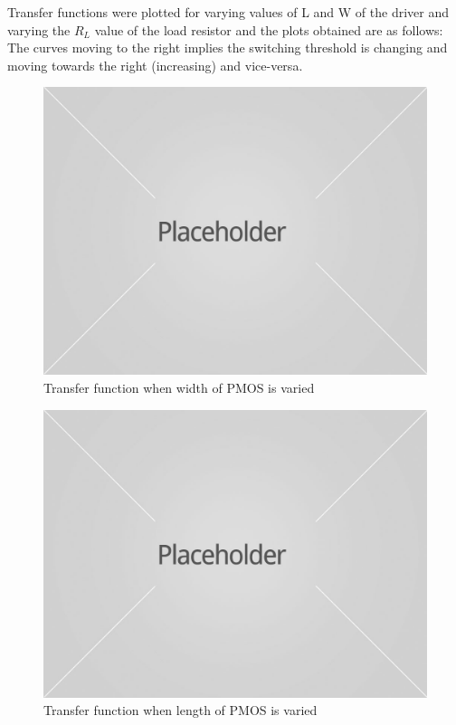 \documentclass[12pt,a4paper]{article}
\begin{document}
Transfer functions were plotted for varying values of L and W of the driver and varying the $R_L$ value of the load resistor and the plots obtained are as follows:\\

The curves moving to the right implies the switching threshold is changing and moving towards the right (increasing) and vice-versa.\\

\begin{figure}[H]
\begin{center}
\includegraphics[scale=0.20]{placeholder.jpg}
\caption{Transfer function when width of PMOS is varied}
\end{center}
\end{figure}


\begin{figure}[H]
\begin{center}
\includegraphics[scale=0.20]{placeholder.jpg}
\caption{Transfer function when length of PMOS is varied}
\end{center}
\end{figure}
\end{document}
